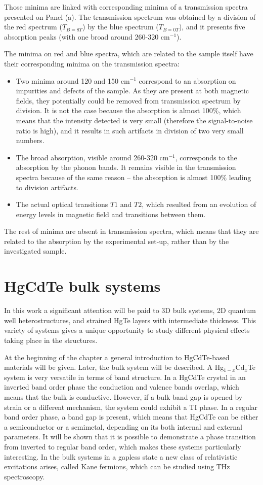 \documentclass[titlepage,a4paper]{book}
\newcommand{\wciecie}{\quad\phantom{v}}
\begin{document}
Those minima are linked with corresponding minima of a transmission spectra presented on Panel (a). The transmission spectrum was obtained by a division of the red spectrum ($T_{B=8T}$) by the blue spectrum ($T_{B=0T}$), and it presents five absorption peaks (with one broad around 260-320 cm$^{-1}$). 

The minima on red and blue spectra, which are related to the sample itself have their corresponding minima on the transmission spectra:
\begin{itemize}
\item Two minima around 120 and 150 cm$^{-1}$ correspond to an absorption on impurities and defects of the sample. As they are present at both magnetic fields, they potentially could be removed from transmission spectrum by division. It is not the case because the absorption is almost 100\%, which means that the intensity detected is very small (therefore the signal-to-noise ratio is high), and it results in such artifacts in division of two very small numbers.
\item The broad absorption, visible around 260-320 cm$^{-1}$, corresponds to the absorption by the phonon bands. It remains visible in the transmission spectra because of the same reason -- the absorption is almost 100\% leading to division artifacts.
\item The actual optical transitions $T1$ and $T2$, which resulted from an evolution of energy levels in magnetic field and transitions between them.
\end{itemize}

The rest of minima are absent in transmission spectra, which means that they are related to the absorption by the experimental set-up, rather than by the investigated sample.


\chapter{HgCdTe bulk systems}
\label{chpt:HgCdTe bulk systems}
\wciecie
In this work a significant attention will be paid to 3D bulk systems, 2D quantum well heterostructures, and strained HgTe layers with intermediate thickness. This variety of systems gives a unique opportunity to study different physical effects taking place in the structures. 

At the beginning of the chapter a general introduction to HgCdTe-based materials will be given. Later, the bulk system will be described. A Hg$_{1-x}$Cd$_x$Te system is very versatile in terms of band structure. In a HgCdTe crystal in an inverted band order phase the conduction and valence bands overlap, which means that the bulk is conductive. However, if a bulk band gap is opened by strain or a different mechanism, the system could exhibit a TI phase. In a regular band order phase, a band gap is present, which means that HgCdTe can be either a semiconductor or a semimetal, depending on its both internal and external parameters. It will be shown that it is possible to demonstrate a phase transition from inverted to regular band order, which makes these systems particularly interesting. In the bulk systems in a gapless state a new class of relativistic excitations arises, called Kane fermions, which can be studied using THz spectroscopy.
\end{document}
